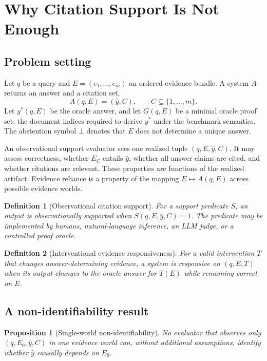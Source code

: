 \documentclass[10pt,twocolumn]{article}
\newtheorem{proposition}{Proposition}
\newtheorem{definition}{Definition}
\newcommand{\botans}{\bot}
\begin{document}
\section{Why Citation Support Is Not Enough}

\subsection{Problem setting}

Let $q$ be a query and $E=(e_1,\ldots,e_m)$ an ordered evidence bundle. A system $A$ returns an answer and a citation set,
\begin{equation}
    A(q,E)=(\hat y, C), \qquad C\subseteq\{1,\ldots,m\}.
\end{equation}
Let $y^*(q,E)$ be the oracle answer, and let $G(q,E)$ be a minimal oracle proof set: the document indices required to derive $y^*$ under the benchmark semantics. The abstention symbol $\botans$ denotes that $E$ does not determine a unique answer.

An observational support evaluator sees one realized tuple $(q,E,\hat y,C)$. It may assess correctness, whether $E_C$ entails $\hat y$, whether all answer claims are cited, and whether citations are relevant. These properties are functions of the realized artifact. Evidence reliance is a property of the mapping $E\mapsto A(q,E)$ across possible evidence worlds.

\begin{definition}[Observational citation support]
For a support predicate $S$, an output is observationally supported when $S(q,E,\hat y,C)=1$. The predicate may be implemented by humans, natural-language inference, an LLM judge, or a controlled proof oracle.
\end{definition}

\begin{definition}[Interventional evidence responsiveness]
For a valid intervention $T$ that changes answer-determining evidence, a system is responsive on $(q,E,T)$ when its output changes to the oracle answer for $T(E)$ while remaining correct on $E$.
\end{definition}

\subsection{A non-identifiability result}

\begin{proposition}[Single-world non-identifiability]
No evaluator that observes only $(q,E_0,\hat y,C)$ in one evidence world can, without additional assumptions, identify whether $\hat y$ causally depends on $E_0$.
\end{proposition}
\end{document}
